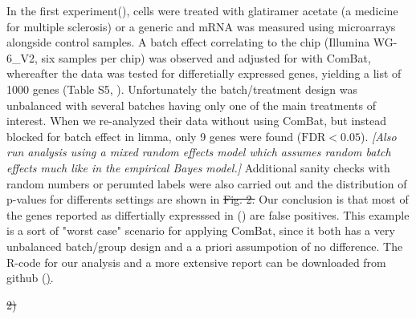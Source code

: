 \documentclass{bio}
\newcommand\NB[1]{\textcolor{NBcol}{\textit{#1}}} %
\newcommand\NOTE[1]{\NB{[#1]}} %
\providecommand{\DIFaddtex}[1]{{\protect\color{blue}\uwave{#1}}} %
\providecommand{\DIFdeltex}[1]{{\protect\color{red}\sout{#1}}}                      %
\providecommand{\DIFaddbegin}{} %
\providecommand{\DIFaddend}{} %
\providecommand{\DIFdelbegin}{} %
\providecommand{\DIFdelend}{} %
\providecommand{\DIFadd}[1]{\texorpdfstring{\DIFaddtex{#1}}{#1}} %
\providecommand{\DIFdel}[1]{\texorpdfstring{\DIFdeltex{#1}}{}} %
\begin{document}
\DIFaddend In the first experiment(\citealp{Towfic2014}), cells were treated with glatiramer acetate (a medicine for multiple sclerosis) or a generic and mRNA was measured using microarrays alongside control samples. A batch effect correlating to the chip (Illumina WG-6\_V2, six samples per chip) was observed and adjusted for with ComBat, whereafter the data was tested for differetially expressed genes, yielding a list of 1000 genes (Table S5, \citealp{Towfic2014}). Unfortunately the batch/treatment design was unbalanced with several batches having only one of the main treatments of interest. When we re-analyzed their data without using ComBat, but instead blocked for batch effect in limma, only 9 genes were found ($\text{FDR}<0.05$). \DIFaddbegin \NOTE{Also run analysis using a mixed random effects model which assumes random batch effects much like in the empirical Bayes model.} \DIFaddend Additional sanity checks with random numbers or perumted labels were also carried out and the distribution of p-values for differents settings are shown in \DIFdelbegin \DIFdel{Fig.  2.  }\DIFdelend \DIFaddbegin \DIFadd{Figure~\ref{fig:p-towfic}.  }\DIFaddend Our conclusion is that most of the genes reported as differtially expresssed in (\citealp{Towfic2014}) are false positives. This example is a sort of "worst case" scenario for applying ComBat, since it both has a very unbalanced batch/group design and a a priori assumpotion of no difference. The R-code for our analysis and a more extensive report can be downloaded from github (\href{https://github.com/vegardny/combat_tests.git}).


\DIFdelbegin \DIFdel{2) }\DIFdelend \DIFaddbegin \subsubsection{\DIFadd{Experiment 2}}
\end{document}
